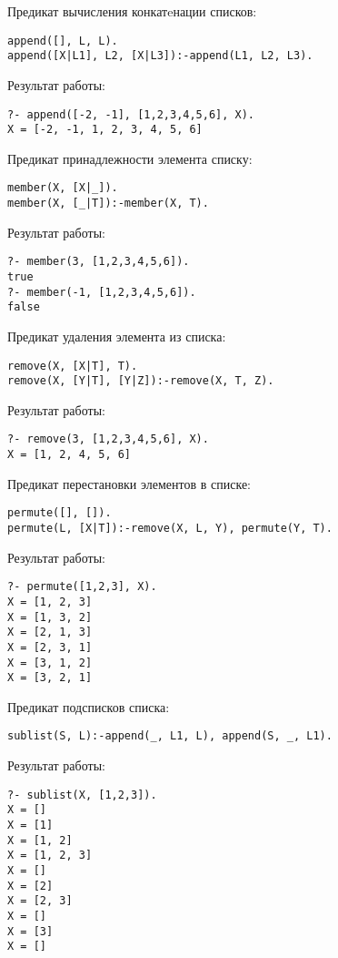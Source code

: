 \documentclass[12pt]{article}
\begin{document}
Предикат вычисления  конкатeнации списков:
\begin{lstlisting}
append([], L, L).
append([X|L1], L2, [X|L3]):-append(L1, L2, L3).
\end{lstlisting}
Результат работы:
\begin{lstlisting}
?- append([-2, -1], [1,2,3,4,5,6], X).
X = [-2, -1, 1, 2, 3, 4, 5, 6]
\end{lstlisting}

Предикат принадлежности элемента списку:
\begin{lstlisting}
member(X, [X|_]).
member(X, [_|T]):-member(X, T).
\end{lstlisting}
Результат работы:
\begin{lstlisting}
?- member(3, [1,2,3,4,5,6]).
true
?- member(-1, [1,2,3,4,5,6]).
false
\end{lstlisting}

Предикат удаления элемента из списка:
\begin{lstlisting}
remove(X, [X|T], T).
remove(X, [Y|T], [Y|Z]):-remove(X, T, Z).
\end{lstlisting}
Результат работы:
\begin{lstlisting}
?- remove(3, [1,2,3,4,5,6], X).
X = [1, 2, 4, 5, 6]
\end{lstlisting}

Предикат перестановки элементов в списке:
\begin{lstlisting}
permute([], []).
permute(L, [X|T]):-remove(X, L, Y), permute(Y, T).
\end{lstlisting}
Результат работы:
\begin{lstlisting}
?- permute([1,2,3], X).
X = [1, 2, 3]
X = [1, 3, 2]
X = [2, 1, 3]
X = [2, 3, 1]
X = [3, 1, 2]
X = [3, 2, 1]
\end{lstlisting}

Предикат подсписков списка:
\begin{lstlisting}
sublist(S, L):-append(_, L1, L), append(S, _, L1).
\end{lstlisting}
Результат работы:
\begin{lstlisting}
?- sublist(X, [1,2,3]).
X = []
X = [1]
X = [1, 2]
X = [1, 2, 3]
X = []
X = [2]
X = [2, 3]
X = []
X = [3]
X = []
\end{lstlisting}
\end{document}
